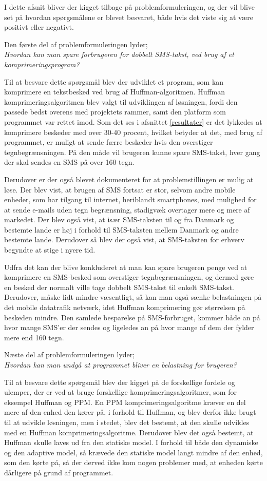 I dette afsnit bliver der kigget tilbage på problemformuleringen, og der vil blive set på hvordan spørgsmålene er blevet besvaret, både hvis det viste sig at være positivt eller negativt.

Den første del af problemformuleringen lyder;\\
\emph{Hvordan kan man spare forbrugeren for dobbelt SMS-takst, ved brug af et komprimeringsprogram?}
 
Til at besvare dette spørgsmål blev der udviklet et program, som kan komprimere en tekstbesked ved brug af Huffman-algoritmen. Huffman komprimeringsalgoritmen blev valgt til udviklingen af løsningen, fordi den passede bedst overens med projektets rammer, samt den platform som programmet var rettet imod. Som det ses i afsnittet \ref{resultater} er det lykkedes at komprimere beskeder med over 30-40 procent, hvilket betyder at det, med brug af programmet, er muligt at sende færre beskeder hvis den overstiger tegnbegrænsningen. På den måde vil brugeren kunne spare SMS-takst, hver gang der skal sendes en SMS på over 160 tegn.
 
Derudover er der også blevet dokumenteret for at problemstillingen er mulig at løse. Der blev vist, at brugen af SMS fortsat er stor, selvom andre mobile enheder, som har tilgang til internet, heriblandt smartphones, med mulighed for at sende e-mails uden tegn begrænsning, stadigvæk overtager mere og mere af markedet. Der blev også vist, at især SMS-taksten til og fra Danmark og bestemte lande er høj i forhold til SMS-taksten mellem Danmark og andre bestemte lande. Derudover så blev der også vist, at SMS-taksten for erhverv begyndte at stige i nyere tid.
 
Udfra det kan der blive konkluderet at man kan spare brugeren penge ved at komprimere en SMS-besked som overstiger tegnbegrænsningen, og dermed gøre en besked der normalt ville tage dobbelt SMS-takst til enkelt SMS-takst. Derudover, måske lidt mindre væsentligt, så kan man også sænke belastningen på det mobile datatrafik netværk, idet Huffman komprimering gør størrelsen på beskeden mindre. Den samlede besparelse på SMS-forbruget, kommer både an på hvor mange SMS'er der sendes og ligeledes an på hvor mange af dem der fylder mere end 160 tegn.

 
Næste del af problemformuleringen lyder;\\
\emph{Hvordan kan man undgå at programmet bliver en belastning for brugeren?} 

Til at besvare dette spørgsmål blev der kigget på de forskellige fordele og ulemper, der er ved at bruge forskellige komprimeringsalgoritmer, som for eksempel Huffman og PPM. En PPM komprimeringsalgoritme kræver en del mere af den enhed den kører på, i forhold til Huffman, og blev derfor ikke brugt til at udvikle løsningen, men i stedet, blev det bestemt, at den skulle udvikles med en Huffman komprimeringsalgoritme. Derudover blev det også bestemt, at Huffman skulle laves ud fra den statiske model. I forhold til både den dynamiske og den adaptive model, så krævede den statiske model langt mindre af den enhed, som den kørte på, så der derved ikke kom nogen problemer med, at enheden kørte dårligere på grund af programmet. 

